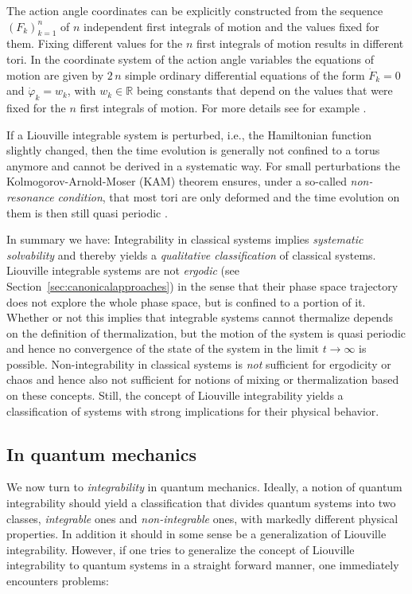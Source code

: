 \documentclass[a4paper,12pt,listof=totoc,index=totoc,bibliography=totoc,headsepline=false,headings=normal,BCOR16.153846mm,DIV12,headinclude,twoside,cleardoublepage=empty,numbers=noenddot,final]{scrreprt}
\theoremstyle{mystyle}
\numberwithin{equation}{section}
\numberwithin{figure}{section}
\numberwithin{lemma}{section}
\numberwithin{theorem}{section}
\numberwithin{corollary}{section}
\numberwithin{definition}{section}
\numberwithin{conjecture}{section}
\numberwithin{observation}{section}
\newcommand{\+}{\mkern2mu}
\DeclareMathOperator{\1}{\mathds{1}}
\newcommand{\mb}[1]{\mathbb{#1}}
\newcommand{\R}{\mb{R}}
\begin{document}
The action angle coordinates can be explicitly constructed from the sequence $(F_k)_{k=1}^{n}$ of $n$ independent first integrals of motion and the values fixed for them.
Fixing different values for the $n$ first integrals of motion results in different tori.
In the coordinate system of the action angle variables the equations of motion are given by $2\,n$ simple ordinary differential equations of the form $\dot F_k = 0$ and $\dot \varphi_k = w_k$, with $w_k \in \R$ being constants that depend on the values that were fixed for the $n$ first integrals of motion.
For more details see for example \cite[Section 49]{Arnold78}.

If a Liouville integrable system is perturbed, i.e., the Hamiltonian function slightly changed, then the time evolution is generally not confined to a torus anymore and cannot be derived in a systematic way.
For small perturbations the Kolmogorov-Arnold-Moser (KAM) theorem ensures, under a so-called \emph{non-resonance condition}, that most tori are only deformed and the time evolution on them is then still quasi periodic \cite{Moradi2001,Tabor1989,Poeschel03}.

In summary we have:
Integrability in classical systems implies \emph{systematic solvability} and thereby yields a \emph{qualitative classification} of classical systems. 
Liouville integrable systems are not \emph{ergodic} (see Section~\ref{sec:canonicalapproaches}) in the sense that their phase space trajectory does not explore the whole phase space, but is confined to a portion of it.
Whether or not this implies that integrable systems cannot thermalize depends on the definition of thermalization, but the motion of the system is quasi periodic and hence no convergence of the state of the system in the limit $t\to\infty$ is possible.
Non-integrability in classical systems is \emph{not} sufficient for ergodicity or chaos and hence also not sufficient for notions of mixing or thermalization based on these concepts.
Still, the concept of Liouville integrability yields a classification of systems with strong implications for their physical behavior.


\subsection{In quantum mechanics}
\label{sec:integrabilityinquantumtheory}
%
We now turn to \emph{integrability} in quantum mechanics.
Ideally, a notion of quantum integrability should yield a classification that divides quantum systems into two classes, \emph{integrable} ones and \emph{non-integrable} ones, with markedly different physical properties.
In addition it should in some sense be a generalization of Liouville integrability.
However, if one tries to generalize the concept of Liouville integrability to quantum systems in a straight forward manner, one immediately encounters problems:
\end{document}
